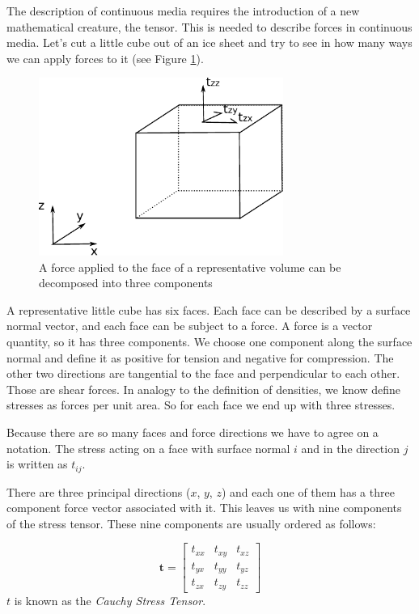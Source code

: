 \documentclass[12pt, openany]{memoir}
\begin{document}
The description of continuous media requires the introduction of a new
mathematical creature, the tensor. This is needed to describe forces
in continuous media. Let's cut a little cube out of an ice sheet and
try to see in how many ways we can apply forces to it (see
Figure \ref{fig:tensor}).

\begin{figure}
\includegraphics[width=8cm]{tensor}
\caption{\label{fig:tensor} A force applied to the face of a
representative volume can be decomposed into three components}
\end{figure}

A representative little cube has six faces. Each face can be described
 by a surface normal vector, and each face can be subject
 to a force. A force is a vector quantity, so it has three
 components. We choose one component along the surface normal and
 define it as positive for tension and negative for compression. The
 other two directions are tangential to the face and perpendicular to
 each other. Those are shear forces. In analogy to the definition of
 densities, we know define stresses as forces per unit area. So for
 each face we end up with three stresses. 

Because there are so many faces and force directions we have to agree
on a notation. The stress acting on a face with surface normal $i$ and
in the direction $j$ is written as $t_{ij}$.

There are three principal directions ($x$, $y$, $z$) and each one of
them has a three component force vector associated with it. This
leaves us with nine components of the stress tensor. These nine
components are usually ordered as follows: 

\begin{equation}
\mathbf{t} = \left[ \begin{array}{ccc} t_{xx} & t_{xy} & t_{xz} \\
t_{yx} & t_{yy} & t_{yz} \\ t_{zx} & t_{zy} &
t_{zz} \end{array} \right]
\end{equation}
$t$ is known as the \emph{Cauchy Stress Tensor}. 
\end{document}
